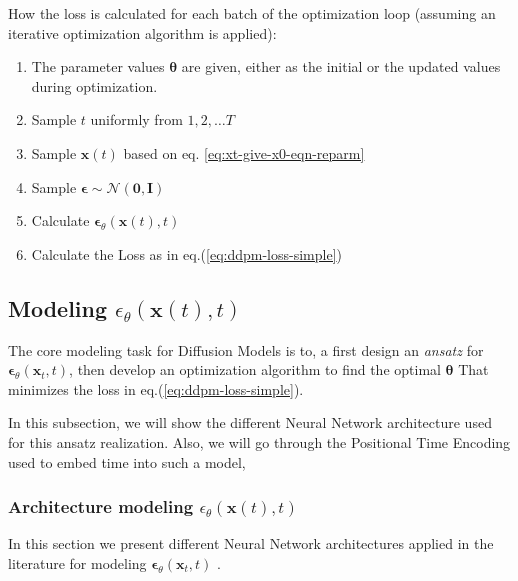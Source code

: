 \documentclass[11pt]{article}
\begin{document}
    How the loss is calculated for each batch of the optimization loop (assuming an iterative optimization algorithm is applied):
    \begin{enumerate}
        \item The parameter values $\bm{\theta}$ are given, either as the initial or the updated values during optimization.
        \item Sample $t$ uniformly from $1,2,\dots T$
        \item Sample $\mathbf{x}(t)$ based on eq. \ref{eq:xt-give-x0-eqn-reparm}
        \item Sample $\bm{\epsilon} \sim \mathcal{N}(\mathbf{0},\mathbf{I})$
        \item Calculate $\bm{\epsilon}_{\theta}(\mathbf{x}(t),t)$
        \item Calculate the Loss as in eq.(\ref{eq:ddpm-loss-simple})
    \end{enumerate}


    \subsection{Modeling $\epsilon_{\theta}(\mathbf{x}(t),t)$}\label{subsec:modeling-ddpm-prametric-noise}
    The core modeling task for Diffusion Models is to, a first design an \textit{ansatz} for
    $\bm{\epsilon}_{\theta}(\mathbf{x}_t,t)$, then develop an optimization algorithm to find the optimal $\bm{\theta}$
    That minimizes the loss in eq.(\ref{eq:ddpm-loss-simple}).

    In this subsection, we will show the different
    Neural Network architecture used for this ansatz realization.
    Also, we will go through the Positional Time Encoding used to embed time into such a model,

    \subsubsection{Architecture modeling $\epsilon_{\theta}(\mathbf{x}(t),t)$}
    In this section we present different Neural Network architectures applied in the literature for modeling
    $\bm{\epsilon}_{\theta}(\mathbf{x}_t,t)$ \cite{Diffusio93:online,ho2020denoising,WhatareD38:online}.

\end{document}
